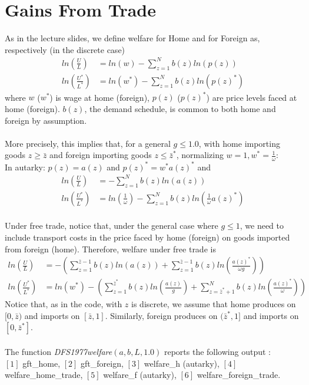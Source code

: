 \documentclass[10pt, final]{article}
\begin{document}
\section{Gains From Trade} %
As in the lecture slides, we define welfare for Home and for Foreign as, respectively (in the discrete case)
\begin{align*}
	ln(\frac{U}{L}) &= ln(w) - \sum_{z=1}^N b(z) ln(p(z)) \\
	ln(\frac{U^*}{L^*}) &= ln(w^*) - \sum_{z=1}^N b(z) ln(p(z)^*)
\end{align*}
where $w$ ($w^*$) is wage at home (foreign), $p(z)$ ($p(z)^*$) are price levels faced at home (foreign). $b(z)$, the demand schedule, is common to both home and foreign by assumption.
\\
\\
More precisely, this implies that, for a general $g \leq 1.0$, with home importing goods $z \geq \bar{z}$ and foreign importing goods $z \leq \bar{z}^*$, normalizing $w = 1, w^* = \frac{1}{\omega}$:
\\
In autarky: $p(z) = a(z)$ and $p(z)^* = w^* a(z)^*$ and
\begin{align*}
	ln(\frac{U}{L}) &= - \sum_{z=1}^N b(z) ln(a(z)) \\
	ln(\frac{U^*}{L^*}) &= ln(\frac{1}{\omega}) - \sum_{z=1}^N b(z) ln(\frac{1}{\omega} a(z)^*)
\end{align*}
\\
Under free trade, notice that, under the general case where $g \leq 1$, we need to include transport costs in the price faced by home (foreign) on goods imported from foreign (home). Therefore, welfare under free trade is
\begin{align*}
	ln(\frac{U}{L}) &= - (\sum_{z=1}^{\bar{z}-1} b(z) ln(a(z)) + \sum_{z=1}^{\bar{z}-1} b(z) ln(\frac{a(z)^*}{\omega g}))  \\
	ln(\frac{U^*}{L^*}) &= ln(w^*) - (\sum_{z=1}^{\bar{z}^*} b(z) ln(\frac{a(z)}{g}) + \sum_{z=\bar{z}^* + 1}^N b(z) ln(\frac{a(z)^*}{\omega}))
\end{align*}
Notice that, as in the code, with $z$ is discrete, we assume that home produces on $[0,\bar{z})$ and imports on $[\bar{z}, 1]$. Similarly, foreign produces on $(\bar{z}^*, 1]$ and imports on $[0, \bar{z}^*]$.
\\
\\
The function \textit{DFS1977welfare$(a, b, L, 1.0)$} reports the following output : \\ $[1]$ gft\_home, $[2]$ gft\_foreign, $[3]$ welfare\_h (autarky), $[4]$ welfare\_home\_trade, $[5]$ welfare\_f (autarky), $[6]$ welfare\_foreign\_trade. 
\end{document}
